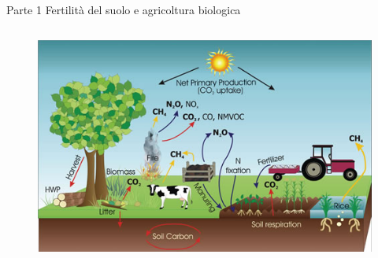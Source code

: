 \documentclass[10pt]{beamer}
\begin{document}
\begin{frame}{Parte 1 \small{Fertilità del suolo e agricoltura biologica}}
\begin{columns}
{\begin{figure}[h]
        \includegraphics[width=\textwidth]{../foto/carbonCycle.jpg}
      \end{figure}}
  \end{columns}
\end{frame}
\end{document}
